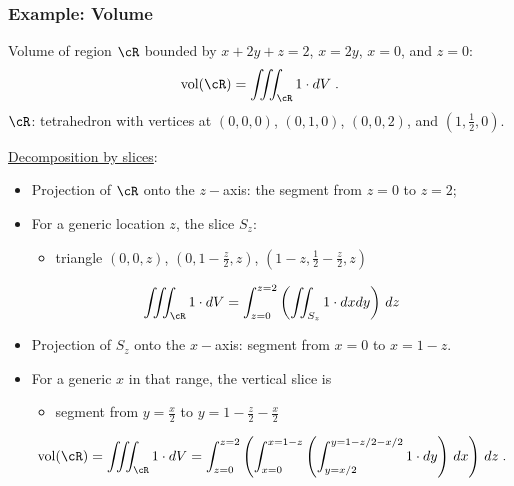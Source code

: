 \begin{frame}
  \frametitle{Example: Volume}

Volume of region $\cR$ bounded by  $x+2y+z=2$, $x=2y$, $x=0$, and $z=0$:
%
$$\text{vol}(\cR) = \iiint_{\cR} 1\cdot dV\; .$$
%
$\cR$: tetrahedron with vertices at $(0,0,0)$, $(0,1,0)$, $(0,0,2)$, and $(1, \frac{1}{2}, 0)$.

\underline{Decomposition by slices}:
\begin{itemize}
  \item Projection of $\cR$ onto the $z-$axis: the segment from $z=0$ to $z=2$;
  \item For a generic location $z$, the slice $S_z$:
   \begin{itemize}
     \item triangle $(0,0,z)$, $(0,1-\frac{z}{2},z)$, $(1-z, \frac{1}{2}-\frac{z}{2},z)$
   \end{itemize}
%
$$\iiint_{\cR} 1\cdot dV = \int_{z=0}^{z=2} \left( \iint_{S_z} 1\cdot dxdy \right) \, dz$$
%
\item Projection of $S_z$ onto the $x-$axis: segment from $x=0$ to $x=1-z$.
\item For a generic $x$ in that range, the vertical slice is
\begin{itemize}
  \item segment from $y=\frac{x}{2}$ to $y=1-\frac{z}{2} - \frac{x}{2}$
\end{itemize}
%
$$\text{vol}(\cR) = \iiint_{\cR} 1\cdot dV = \int_{z=0}^{z=2} \left(\int_{x=0}^{x=1-z} \left( \int_{y=x/2}^{y=1-z/2-x/2} 1 \cdot dy \right) \, dx\right) \, dz\; .$$
%
\end{itemize}
\end{frame}

